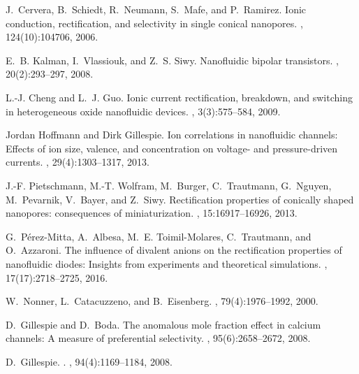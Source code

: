 \documentclass[fleqn,10pt]{SelfArx} %
\begin{document}
\begin{thebibliography}{10}

J.~Cervera, B.~Schiedt, R.~Neumann, S.~Mafe, and P.~Ramirez.
\newblock Ionic conduction, rectification, and selectivity in single conical
  nanopores.
, 124(10):104706, 2006.

E.~B. Kalman, I.~Vlassiouk, and Z.~S. Siwy.
\newblock Nanofluidic bipolar transistors.
, 20(2):293--297, 2008.

L.-J. Cheng and L.~J. Guo.
\newblock Ionic current rectification, breakdown, and switching in
  heterogeneous oxide nanofluidic devices.
, 3(3):575--584, 2009.

Jordan Hoffmann and Dirk Gillespie.
\newblock Ion correlations in nanofluidic channels: {Effects} of ion size,
  valence, and concentration on voltage- and pressure-driven currents.
, 29(4):1303--1317, 2013.

J.-F. Pietschmann, M.-T. Wolfram, M.~Burger, C.~Trautmann, G.~Nguyen,
  M.~Pevarnik, V.~Bayer, and Z.~Siwy.
\newblock Rectification properties of conically shaped nanopores: consequences
  of miniaturization.
, 15:16917--16926, 2013.

G.~P\'{e}rez-Mitta, A.~Albesa, M.~E. Toimil-Molares, C.~Trautmann, and
  O.~Azzaroni.
\newblock The influence of divalent anions on the rectification properties of
  nanofluidic diodes: {Insights} from experiments and theoretical simulations.
, 17(17):2718--2725, 2016.

W.~Nonner, L.~Catacuzzeno, and B.~Eisenberg.
, 79(4):1976--1992, 2000.

D.~Gillespie and D.~Boda.
\newblock The anomalous mole fraction effect in calcium channels: {A} measure
  of preferential selectivity.
, 95(6):2658--2672, 2008.

D.~Gillespie.
.
, 94(4):1169--1184, 2008.


\end{thebibliography}
\end{document}
